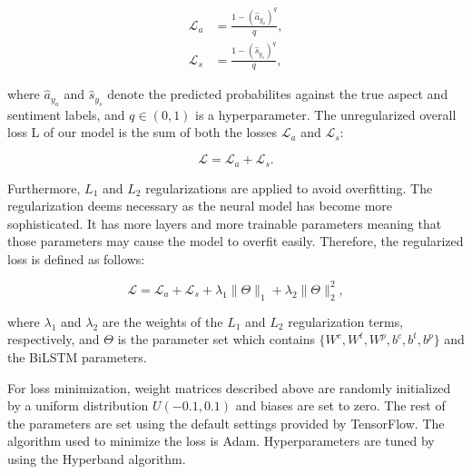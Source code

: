 \documentclass[american, oneside]{ecsgdp}
\begin{document}
\begin{align}
  \mathcal{L}_a & = \frac{1 - \left( \hat{a}_{y_a} \right)^q} {q}, \\
  \mathcal{L}_s & = \frac{1 - \left( \hat{s}_{y_s} \right)^q} {q},
\end{align}

\noindent where $\hat{a}_{y_a}$ and $\hat{s}_{y_s}$ denote the predicted probabilites against the true aspect and sentiment labels, and $q \in (0, 1)$ is a hyperparameter. The unregularized overall loss L of our model is the sum of both the losses $\mathcal{L}_a$ and $\mathcal{L}_s$:

\begin{equation}
    \mathcal{L} = \mathcal{L}_a + \mathcal{L}_s.
\end{equation}

Furthermore, $L_1$ and $L_2$ regularizations are applied to avoid overfitting. The regularization deems necessary as the neural model has become more sophisticated. It has more layers and more trainable parameters meaning that those parameters may cause the model to overfit easily. Therefore, the regularized loss is defined as follows:

\begin{equation}
    \mathcal{L} = \mathcal{L}_a + \mathcal{L}_s + \lambda_1 \|\Theta\|_1 + \lambda_2  \|\Theta\|^2_2,
\end{equation}

\noindent where $\lambda_1$ and $\lambda_2$ are the weights of the $L_1$ and $L_2$ regularization terms, respectively, and $\Theta$ is the parameter set which contains $\{W^c, W^t, W^p, b^c, b^t, b^p\}$ and the BiLSTM parameters.

For loss minimization, weight matrices described above are randomly initialized by a uniform distribution $U(-0.1, 0.1)$ and biases are set to zero. The rest of the parameters are set using the default settings provided by TensorFlow. The algorithm used to minimize the loss is Adam. %
Hyperparameters are tuned by using the Hyperband algorithm. %




\end{document}
